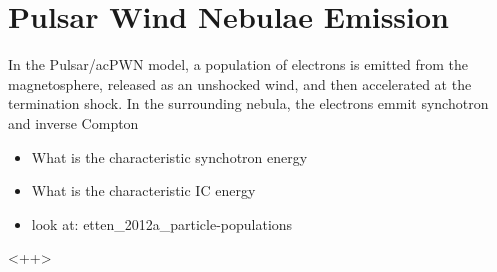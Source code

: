 \section{Pulsar Wind Nebulae Emission}

In the Pulsar/ac{PWN} model, a population of electrons
is emitted from the magnetosphere, released as an unshocked wind,
and then accelerated at the termination shock. In the surrounding
nebula, the electrons emmit synchotron and inverse Compton

\begin{itemize}
  \item What is the characteristic synchotron energy
  \item What is the characteristic \ac{IC} energy
  \item look at: etten\_2012a\_particle-populations
\end{itemize}<++>
